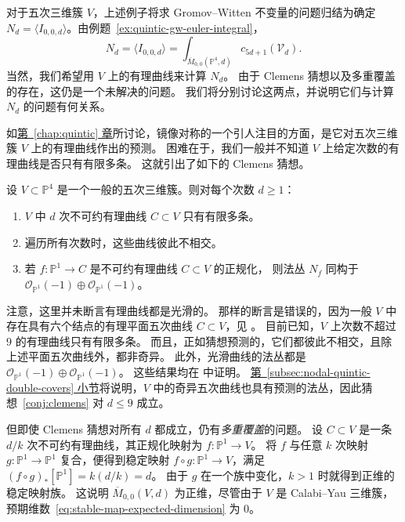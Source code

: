 对于五次三维簇 $V$，上述例子将求 Gromov--Witten 不变量的问题归结为确定
$N_d=\langle I_{0,0,d}\rangle$。由例题~\ref{ex:quintic-gw-euler-integral}，
\[
N_d=\langle I_{0,0,d}\rangle=\int_{\overline M_{0,0}(\mathbb P^4,d)}c_{5d+1}(\mathcal V_d).
\]
当然，我们希望用 $V$ 上的有理曲线来计算 $N_d$。
由于 Clemens 猜想以及多重覆盖的存在，这仍是一个未解决的问题。
我们将分别讨论这两点，并说明它们与计算 $N_d$ 的问题有何关系。

如\hyperref[chap:quintic]{第~\ref*{chap:quintic} 章}所讨论，镜像对称的一个引人注目的方面，是它对五次三维簇 $V$ 上的有理曲线作出的预测。
困难在于，我们一般并不知道 $V$ 上给定次数的有理曲线是否只有有限多条。
这就引出了如下的 Clemens 猜想。
\begin{conjecture}\label{conj:clemens}
设 $V\subset\mathbb P^4$ 是一个一般的五次三维簇。则对每个次数 $d\geq1$：
\begin{enumerate}[label=(\roman*)]
\item $V$ 中 $d$ 次不可约有理曲线 $C\subset V$ 只有有限多条。
\item 遍历所有次数时，这些曲线彼此不相交。
\item 若 $f:\mathbb P^1\to C$ 是不可约有理曲线 $C\subset V$ 的正规化，
则法丛 $N_f$ 同构于 $\mathcal O_{\mathbb P^1}(-1)\oplus\mathcal O_{\mathbb P^1}(-1)$。
\end{enumerate}
\end{conjecture}
注意，这里并未断言有理曲线都是光滑的。
那样的断言是错误的，因为一般 $V$ 中存在具有六个结点的有理平面五次曲线 $C\subset V$，见 。
目前已知，$V$ 上次数不超过 $9$ 的有理曲线只有有限多条。
而且，正如猜想预测的，它们都彼此不相交，且除上述平面五次曲线外，都非奇异。
此外，光滑曲线的法丛都是 $\mathcal O_{\mathbb P^1}(-1)\oplus\mathcal O_{\mathbb P^1}(-1)$。
这些结果均在  中证明。
\hyperref[subsec:nodal-quintic-double-covers]{第~\ref*{subsec:nodal-quintic-double-covers} 小节}将说明，$V$ 中的奇异五次曲线也具有预测的法丛，因此猜想~\ref{conj:clemens} 对 $d\leq9$ 成立。

但即使 Clemens 猜想对所有 $d$ 都成立，仍有\emph{多重覆盖}的问题。
设 $C\subset V$ 是一条 $d/k$ 次不可约有理曲线，其正规化映射为 $f:\mathbb P^1\to V$。
将 $f$ 与任意 $k$ 次映射 $g:\mathbb P^1\to\mathbb P^1$ 复合，便得到稳定映射
$f\circ g:\mathbb P^1\to V$，满足 $(f\circ g)_*[\mathbb P^1]=k(d/k)=d$。
由于 $g$ 在一个族中变化，$k>1$ 时就得到正维的稳定映射族。
这说明 $\overline M_{0,0}(V,d)$ 为正维，尽管由于 $V$ 是 Calabi--Yau 三维簇，预期维数~\eqref{eq:stable-map-expected-dimension} 为 $0$。

